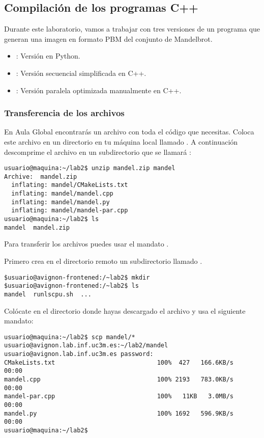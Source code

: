 \subsection{Compilación de los programas C++}

Durante este laboratorio, vamos a trabajar con tres versiones de un programa
que generan una imagen en formato PBM del conjunto de Mandelbrot.

\begin{itemize}
  \item {}: Versión en Python.
  \item {}: Versión secuencial simplificada en C++.
  \item {}: Versión paralela optimizada manualmente en C++.
\end{itemize}

\subsubsection{Transferencia de los archivos}

En Aula Global encontrarás un archivo  con toda el código que
necesitas. Coloca este archivo en un directorio en tu máquina local llamado
. A continuación descomprime el archivo en un subdirectorio que
se llamará :

\begin{lstlisting}[style=terminal]
usuario@maquina:~/lab2$ unzip mandel.zip mandel
Archive:  mandel.zip
  inflating: mandel/CMakeLists.txt   
  inflating: mandel/mandel.cpp       
  inflating: mandel/mandel.py        
  inflating: mandel/mandel-par.cpp   
usuario@maquina:~/lab2$ ls
mandel  mandel.zip
\end{lstlisting}

Para transferir los archivos puedes usar el mandato .

Primero crea en el directorio remoto un subdirectorio llamado .

\begin{lstlisting}[style=terminal]
$usuario@avignon-frontened:/~lab2$ mkdir
$usuario@avignon-frontened:/~lab2$ ls
mandel  runlscpu.sh  ...
\end{lstlisting}

Colócate en el directorio donde hayas descargado el archivo 
y usa el siguiente mandato:

\begin{lstlisting}[style=terminal,basicstyle=\tiny\ttfamily,columns=fixed]
usuario@maquina:~/lab2$ scp mandel/* usuario@avignon.lab.inf.uc3m.es:~/lab2/mandel
usuario@avignon.lab.inf.uc3m.es password: 
CMakeLists.txt                            100%  427   166.6KB/s   00:00    
mandel.cpp                                100% 2193   783.0KB/s   00:00    
mandel-par.cpp                            100%   11KB   3.0MB/s   00:00    
mandel.py                                 100% 1692   596.9KB/s   00:00    
usuario@maquina:~/lab2$ 
\end{lstlisting}

